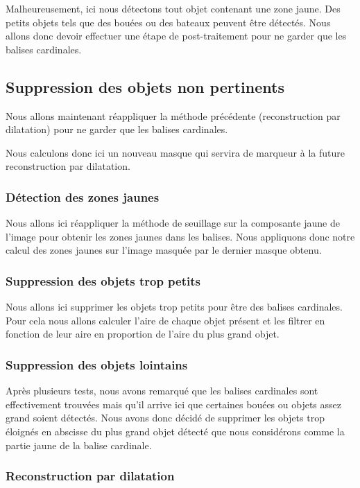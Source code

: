 \documentclass{article}
\begin{document}
Malheureusement, ici nous détectons tout objet contenant une zone jaune. Des
petits objets tels que des bouées ou des bateaux peuvent être détectés. Nous
allons donc devoir effectuer une étape de post-traitement pour ne garder que
les balises cardinales.

\subsection{Suppression des objets non pertinents}

Nous allons maintenant réappliquer la méthode précédente (reconstruction par
dilatation) pour ne garder que les balises cardinales.

Nous calculons donc ici un nouveau masque qui servira de marqueur à la future
reconstruction par dilatation.

\subsubsection{Détection des zones jaunes}
Nous allons ici réappliquer la méthode de seuillage sur la composante jaune de
l'image pour obtenir les zones jaunes dans les balises. Nous appliquons donc
notre calcul des zones jaunes sur l'image masquée par le dernier masque obtenu.

\subsubsection{Suppression des objets trop petits}
Nous allons ici supprimer les objets trop petits pour être des balises
cardinales. Pour cela nous allons calculer l'aire de chaque objet présent et
les filtrer en fonction de leur aire en proportion de l'aire du plus grand
objet.

\subsubsection{Suppression des objets lointains}
Après plusieurs tests, nous avons remarqué que les balises cardinales sont
effectivement trouvées mais qu'il arrive ici que certaines bouées ou objets
assez grand soient détectés. Nous avons donc décidé de supprimer les objets
trop éloignés en abscisse du plus grand objet détecté que nous considérons
comme la partie jaune de la balise cardinale.

\subsubsection{Reconstruction par dilatation}
\end{document}
